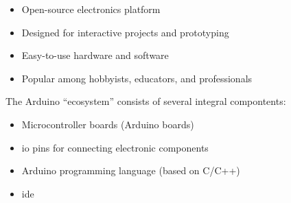 \documentclass[aspectratio=169]{beamer}
\begin{document}
\begin{frame}
    \begin{itemize}
        \item Open-source electronics platform
        \item Designed for interactive projects and prototyping
        \item Easy-to-use hardware and software
        \item Popular among hobbyists, educators, and professionals
    \end{itemize}
    \par The Arduino\textregistered{} ``ecosystem'' consists of several integral compontents:
    \begin{itemize}
        \item Microcontroller boards (Arduino\textregistered{} boards)
        \item \ac{io} pins for connecting electronic components
        \item Arduino\textregistered{} programming language (based on C/C++)
        \item \ac{ide}
    \end{itemize}
\end{frame}

\end{document}
